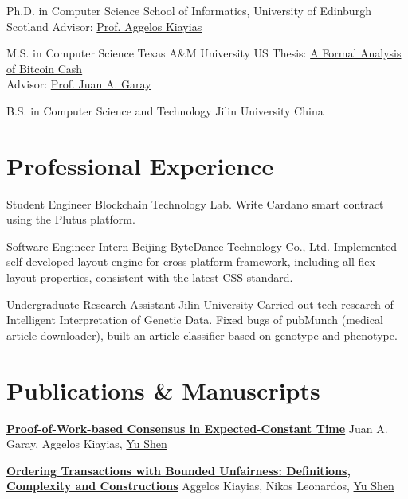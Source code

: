 \documentclass[11pt, a4paper, sans]{moderncv} %
\begin{document}
{Ph.D. in Computer Science}
{School of Informatics, University of Edinburgh}
{Scotland}
{}
{Advisor: \href{https://kiayias.com/}{Prof. Aggelos Kiayias}}

{M.S. in Computer Science}
{Texas A\&M University}
{}
{US}
{Thesis: \href{https://oaktrust.library.tamu.edu/bitstream/handle/1969.1/195819/SHEN-THESIS-2021.pdf}{A Formal Analysis of Bitcoin Cash} \\Advisor: \href{https://jagaray.com/}{Prof. Juan A. Garay}}

{B.S. in Computer Science and Technology}
{Jilin University}
{}
{China}
{}


\section{Professional Experience}

{Student Engineer}
{Blockchain Technology Lab.}
{}
{}
{Write Cardano smart contract using the Plutus platform.}

{Software Engineer Intern}
{Beijing ByteDance Technology Co., Ltd.}
{}
{}
{Implemented self-developed layout engine for cross-platform framework, including all flex layout properties, consistent with the latest CSS standard.}

{Undergraduate Research Assistant}
{Jilin University}
{}
{}
{Carried out tech research of Intelligent Interpretation of Genetic Data. Fixed bugs of pubMunch (medical article downloader), built an article classifier based on genotype and phenotype.}


\section{Publications \& Manuscripts}

{\textbf{\href{https://eprint.iacr.org/2023/1663.pdf}{Proof-of-Work-based Consensus in Expected-Constant Time}}}
{}
{}
{}
{\normalsize Juan A. Garay, Aggelos Kiayias, \underline{Yu Shen}}

{\textbf{\href{https://eprint.iacr.org/2023/1253.pdf}{Ordering Transactions with Bounded Unfairness: Definitions, Complexity and Constructions}}}
{}
{}
{}
{\normalsize Aggelos Kiayias, Nikos Leonardos, \underline{Yu Shen}}
\end{document}
